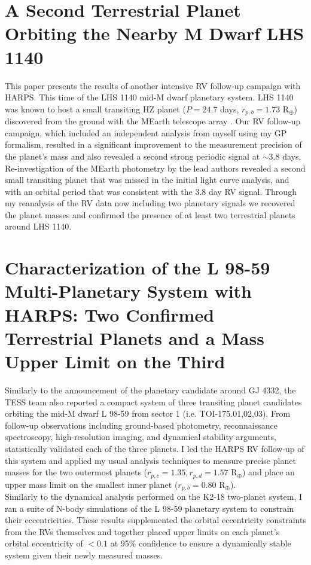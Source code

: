 \section{A Second Terrestrial Planet Orbiting the Nearby M Dwarf LHS 1140
  \citep{ment19}}
This paper presents the results of another intensive RV follow-up campaign with
HARPS. This time of the LHS 1140 mid-M dwarf planetary system. LHS 1140 was known to
host a small transiting HZ planet ($P=24.7$ days, $r_{p,b}=1.73$ R$_{\oplus}$)
discovered from the ground with the MEarth
telescope array \citep{dittmann17a}. Our RV follow-up campaign, which included
an independent analysis from myself using my GP formalism, resulted in a
significant improvement to the measurement precision of the planet's mass and
also revealed a second strong periodic signal at $\sim 3.8$ days. Re-investigation of
the MEarth photometry by the lead authors revealed a second small transiting
planet that was missed in the initial light curve analysis, and with an orbital
period that was consistent with the 3.8 day RV signal. Through my reanalysis of
the RV data now including two planetary signals we recovered the planet masses
and confirmed the presence of at least two terrestrial planets around LHS 1140.

\section{Characterization of the L 98-59 Multi-Planetary System with HARPS:
  Two Confirmed Terrestrial Planets and a Mass Upper Limit on the Third
  \citep{cloutier19c}}
Similarly to the announcement of the planetary candidate around GJ 4332, the
TESS team also reported a compact system of three transiting planet
candidates orbiting the mid-M dwarf L 98-59 from sector 1 (i.e.
TOI-175.01,02,03). From follow-up observations including ground-based
photometry, reconnaissance spectroscopy, high-resolution imaging, and
dynamical stability arguments, \cite{kostov19} statistically validated each of
the three planets. I led the HARPS RV follow-up of this system and applied my
usual analysis techniques to measure precise planet masses for the two outermost
planets ($r_{p,c}=1.35, r_{p,d}=1.57$ R$_{\oplus}$) and place an upper mass limit
on the smallest inner planet ($r_{p,b}=0.80$ R$_{\oplus}$). \\

Similarly to the dynamical analysis performed on the K2-18 two-planet system, I
ran a suite of N-body simulations of the L 98-59 planetary system to constrain
their eccentricities. These results supplemented the orbital eccentricity
constraints from the RVs themselves and together placed upper limits on each
planet's orbital eccentricity of $< 0.1$ at 95\% confidence to ensure a
dynamically stable system given their newly measured masses.



